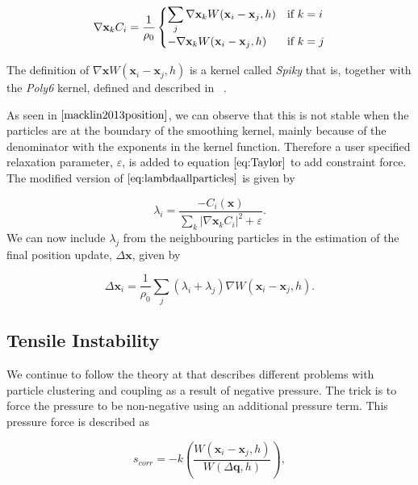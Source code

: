 \begin{equation}
 \nabla \mathbf{x}_k C_i = \frac{1}{\rho_0}
  \begin{cases}
  \label{eq:NablaC}
   \displaystyle \sum\limits_{j} \nabla \mathbf{x}_k W(\mathbf{x}_i - \mathbf{x}_j, h) & $\text{if }$ k = i \\
   - \nabla \mathbf{x}_k W(\mathbf{x}_i - \mathbf{x}_j, h) & $\text{if }$ k = j \\
  \end{cases}
\end{equation}

The definition of $ \nabla \mathbf{x} W(\mathbf{x}_i - \mathbf{x}_j, h) $ is a
kernel called \textit{Spiky} that is, together with the \textit{Poly6}
kernel, defined and described in ~\cite{muller2003particle}.

As seen in $\cite{macklin2013position}$, we can observe that this is not stable
when the particles are at the boundary of the smoothing kernel, mainly because
of the denominator with the exponents in the kernel function.  Therefore a user
specified relaxation parameter, $\varepsilon$, is added to equation $\ref{eq:Taylor}$ to
add constraint force. The modified version of $\ref{eq:lambdaallparticles}$ is
given by

\begin{equation}
\label{eq:LambdaEpsilon}
\lambda_i = \frac{- C_i(\mathbf{x}) }{ \sum\limits_{k} |\nabla \mathbf{x}_k C_i|^2 + \varepsilon}.
\end{equation}
We can now include $\lambda_j$ from the neighbouring particles in the
estimation of the final position update, $\Delta \mathbf{x}$, given by

\begin{equation}
\label{eq:DeltaP}
\Delta \mathbf{x}_i = \frac{1}{\rho_0} \sum\limits_{j} (\lambda_i + \lambda_j) \nabla W(\mathbf{x}_i - \mathbf{x}_j, h).
\end{equation}

\subsection{Tensile Instability} We continue to follow the theory at
\cite{macklin2013position} that describes different problems with particle clustering and
coupling as a result of negative pressure. The trick is to force the
pressure to be non-negative using an additional pressure term. This pressure
force is described as

\begin{equation}
\label{eq:Scorr}
s_{corr} = -k \left( \frac{W(\mathbf{x}_i - \mathbf{x}_j, h)}{W(\Delta \mathbf{q}, h)} \right),
\end{equation}

